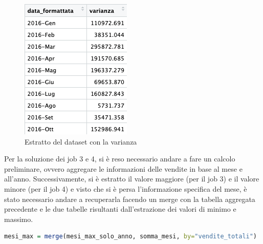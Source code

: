 \begin{figure}[ht]
\begin{minipage}{.3\textwidth}
    \centering
    \includegraphics[width=\linewidth]{img/varianza_r.png}
    \caption{Estratto del dataset con la varianza}
    \label{fig:immagine2}
\end{minipage}
\end{figure}
Per la soluzione dei job 3 e 4, si è reso necessario andare a fare un calcolo preliminare, ovvero aggregare le informazioni delle vendite in base al mese e all'anno. Successivamente, si è estratto il valore maggiore (per il job 3) e il valore minore (per il job 4) e visto che si è persa l'informazione specifica del mese, è stato necessario andare a recuperarla facendo un merge con la tabella aggregata precedente e le due tabelle risultanti dall'estrazione dei valori di minimo e massimo.
\begin{lstlisting}[language=R]
    mesi_max = merge(mesi_max_solo_anno, somma_mesi, by="vendite_totali")
\end{lstlisting}
